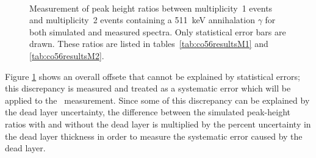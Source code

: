 \documentclass[/main.tex]{subfiles}
\begin{document}
\begin{figure}[p]
  \centering
  \\
  \caption[Peak height ratio comparison results for module 1 and module 2]{\label{fig:co56results}
    Measurement of peak height ratios between multiplicity~1 events and multiplicity~2 events containing a 511~keV annihalation $\gamma$ for both simulated and measured  spectra. Only statistical error bars are drawn. These ratios are listed in tables~\ref{tab:co56resultsM1} and \ref{tab:co56resultsM2}.
  }
\end{figure}
Figure \ref{fig:co56results} shows an overall offsete that cannot be explained by statistical errors; this discrepancy is measured and treated as a systematic error which will be applied to the \bbes\ measurement.
Since some of this discrepancy can be explained by the dead layer uncertainty, the difference between the simulated peak-height ratios with and without the dead layer is multiplied by the percent uncertainty in the dead layer thickness in order to measure the systematic error caused by the dead layer.
\end{document}
